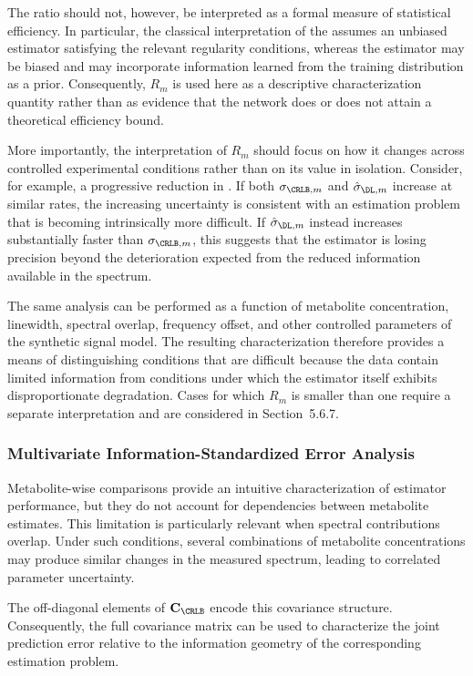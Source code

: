 The ratio should not, however, be interpreted as a formal measure of statistical efficiency. In particular, the classical interpretation of the \CRLB assumes an unbiased estimator satisfying the relevant regularity conditions, whereas the \DL estimator may be biased and may incorporate information learned from the training distribution as a prior. Consequently, $R_m$ is used here as a descriptive characterization quantity rather than as evidence that the network does or does not attain a theoretical efficiency bound.

More importantly, the interpretation of $R_m$ should focus on how it changes across controlled experimental conditions rather than on its value in isolation. Consider, for example, a progressive reduction in \SNR. If both $\sigma_{\CRLB,m}$ and $\hat{\sigma}_{\DL,m}$ increase at similar rates, the increasing uncertainty is consistent with an estimation problem that is becoming intrinsically more difficult. If $\hat{\sigma}_{\DL,m}$ instead increases substantially faster than $\sigma_{\CRLB,m}$, this suggests that the estimator is losing precision beyond the deterioration expected from the reduced information available in the spectrum.

The same analysis can be performed as a function of metabolite concentration, linewidth, spectral overlap, frequency offset, and other controlled parameters of the synthetic signal model. The resulting characterization therefore provides a means of distinguishing conditions that are difficult because the data contain limited information from conditions under which the \DL estimator itself exhibits disproportionate degradation. Cases for which $R_m$ is smaller than one require a separate interpretation and are considered in Section~5.6.7.

\subsubsection{Multivariate Information-Standardized Error Analysis}
\label{sec:Analy&Visual:subsec:infoStand:subsubsec:}
Metabolite-wise comparisons provide an intuitive characterization of estimator performance, but they do not account for dependencies between metabolite estimates. This limitation is particularly relevant when spectral contributions overlap. Under such conditions, several combinations of metabolite concentrations may produce similar changes in the measured spectrum, leading to correlated parameter uncertainty.

The off-diagonal elements of $\mathbf{C}_{\CRLB}$ encode this covariance structure. Consequently, the full covariance matrix can be used to characterize the joint prediction error relative to the information geometry of the corresponding estimation problem.


